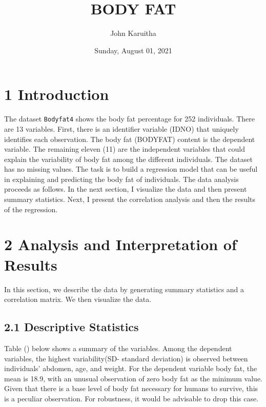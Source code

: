 \documentclass[
]{article}
\title{BODY FAT}
\author{John Karuitha}
\date{Sunday, August 01, 2021}
\begin{document}
\maketitle

{
\setcounter{tocdepth}{2}
\tableofcontents
}
\hypertarget{introduction}{%
\section{\texorpdfstring{\textbf{1
Introduction}}{1 Introduction}}\label{introduction}}

The dataset \texttt{Bodyfat4} shows the body fat percentage for 252
individuals. There are 13 variables. First, there is an identifier
variable (IDNO) that uniquely identifies each observation. The body fat
(BODYFAT) content is the dependent variable. The remaining eleven (11)
are the independent variables that could explain the variability of body
fat among the different individuals. The dataset has no missing values.
The task is to build a regression model that can be useful in explaining
and predicting the body fat of individuals. The data analysis proceeds
as follows. In the next section, I visualize the data and then present
summary statistics. Next, I present the correlation analysis and then
the results of the regression.

\hypertarget{analysis-and-interpretation-of-results}{%
\section{\texorpdfstring{\textbf{2 Analysis and Interpretation of
Results}}{2 Analysis and Interpretation of Results}}\label{analysis-and-interpretation-of-results}}

In this section, we describe the data by generating summary statistics
and a correlation matrix. We then visualize the data.

\hypertarget{descriptive-statistics}{%
\subsection{\texorpdfstring{\textbf{2.1 Descriptive
Statistics}}{2.1 Descriptive Statistics}}\label{descriptive-statistics}}

Table () below shows a summary of the variables. Among the dependent
variables, the highest variability(SD- standard deviation) is observed
between individuals' abdomen, age, and weight. For the dependent
variable body fat, the mean is 18.9, with an unusual observation of zero
body fat as the minimum value. Given that there is a base level of body
fat necessary for humans to survive, this is a peculiar observation. For
robustness, it would be advisable to drop this case.
\end{document}
